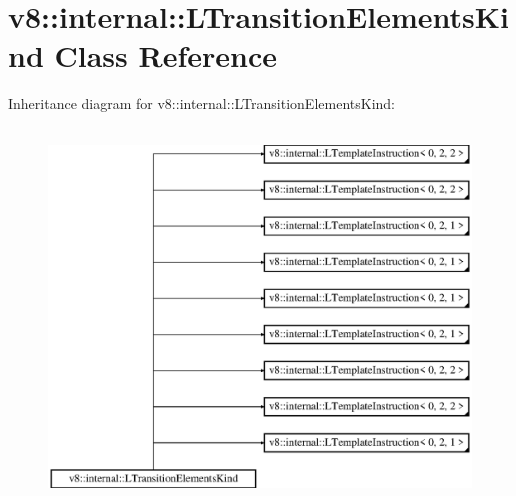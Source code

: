 \hypertarget{classv8_1_1internal_1_1_l_transition_elements_kind}{}\section{v8\+:\+:internal\+:\+:L\+Transition\+Elements\+Kind Class Reference}
\label{classv8_1_1internal_1_1_l_transition_elements_kind}
Inheritance diagram for v8\+:\+:internal\+:\+:L\+Transition\+Elements\+Kind\+:\begin{figure}[H]
\begin{center}
\leavevmode
\includegraphics[height=10.000000cm]{classv8_1_1internal_1_1_l_transition_elements_kind}
\end{center}
\end{figure}
